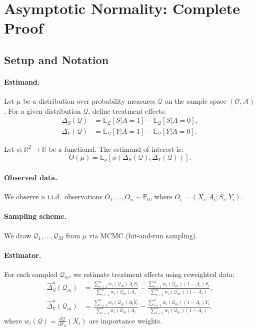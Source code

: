 
\section{Asymptotic Normality: Complete Proof}

\subsection{Setup and Notation}

\paragraph{Estimand.}
Let $\mu$ be a distribution over probability measures $\mathcal{Q}$ on the sample space $(\mathcal{O}, \mathcal{A})$. For a given distribution $\mathcal{Q}$, define treatment effects:
\begin{align}
\Delta_S(\mathcal{Q}) &= \mathbb{E}_{\mathcal{Q}}[S|A=1] - \mathbb{E}_{\mathcal{Q}}[S|A=0], \\
\Delta_Y(\mathcal{Q}) &= \mathbb{E}_{\mathcal{Q}}[Y|A=1] - \mathbb{E}_{\mathcal{Q}}[Y|A=0].
\end{align}

Let $\phi: \mathbb{R}^2 \to \mathbb{R}$ be a functional. The estimand of interest is:
\begin{equation}
\Theta(\mu) = \mathbb{E}_{\mu}[\phi(\Delta_S(\mathcal{Q}), \Delta_Y(\mathcal{Q}))].
\end{equation}

\paragraph{Observed data.}
We observe $n$ i.i.d.\ observations $O_1, \ldots, O_n \sim \mathbb{P}_0$, where $O_i = (X_i, A_i, S_i, Y_i)$.

\paragraph{Sampling scheme.}
We draw $\mathcal{Q}_1, \ldots, \mathcal{Q}_M$ from $\mu$ via MCMC (hit-and-run sampling).

\paragraph{Estimator.}
For each sampled $\mathcal{Q}_m$, we estimate treatment effects using reweighted data:
\begin{align}
\hat{\Delta}_S^n(\mathcal{Q}_m) &= \frac{\sum_{i=1}^n w_i(\mathcal{Q}_m) A_i S_i}{\sum_{i=1}^n w_i(\mathcal{Q}_m) A_i} - \frac{\sum_{i=1}^n w_i(\mathcal{Q}_m) (1-A_i) S_i}{\sum_{i=1}^n w_i(\mathcal{Q}_m) (1-A_i)}, \\
\hat{\Delta}_Y^n(\mathcal{Q}_m) &= \frac{\sum_{i=1}^n w_i(\mathcal{Q}_m) A_i Y_i}{\sum_{i=1}^n w_i(\mathcal{Q}_m) A_i} - \frac{\sum_{i=1}^n w_i(\mathcal{Q}_m) (1-A_i) Y_i}{\sum_{i=1}^n w_i(\mathcal{Q}_m) (1-A_i)},
\end{align}
where $w_i(\mathcal{Q}) = \frac{d\mathcal{Q}}{d\mathbb{P}_0}(X_i)$ are importance weights.


